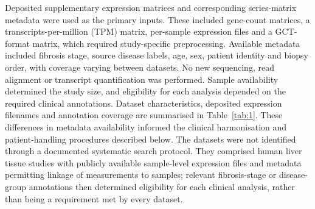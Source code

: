 \documentclass[11pt,a4paper]{article}
\begin{document}
Deposited supplementary expression matrices and corresponding series-matrix metadata were used as the primary inputs. These included gene-count matrices, a transcripts-per-million (TPM) matrix, per-sample expression files and a GCT-format matrix, which required study-specific preprocessing. Available metadata included fibrosis stage, source disease labels, age, sex, patient identity and biopsy order, with coverage varying between datasets. No new sequencing, read alignment or transcript quantification was performed. Sample availability determined the study size, and eligibility for each analysis depended on the required clinical annotations. Dataset characteristics, deposited expression filenames and annotation coverage are summarised in Table~\ref{tab:1}. These differences in metadata availability informed the clinical harmonisation and patient-handling procedures described below. The datasets were not identified through a documented systematic search protocol. They comprised human liver tissue studies with publicly available sample-level expression files and metadata permitting linkage of measurements to samples; relevant fibrosis-stage or disease-group annotations then determined eligibility for each clinical analysis, rather than being a requirement met by every dataset.
\end{document}
